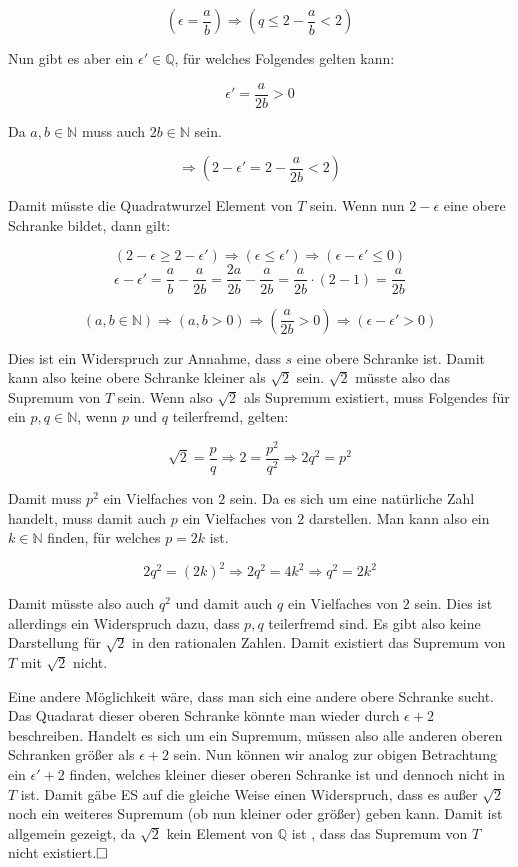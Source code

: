 \documentclass[11pt, a4paper]{article}
\begin{document}
		\[ \left(\epsilon = \dfrac{a}{b}\right) \Rightarrow (q \leq 2-\dfrac{a}{b} < 2) \]

		Nun gibt es aber ein $\epsilon' \in \mathbb{Q}$, für welches Folgendes gelten kann:

		\[ \epsilon' = \dfrac{a}{2b} > 0 \]

		Da $a,b \in \mathbb{N}$ muss auch $2b \in \mathbb{N}$ sein.

		\[ \Rightarrow \left( 2- \epsilon' = 2 - \dfrac{a}{2b} < 2 \right) \]

		Damit müsste die Quadratwurzel Element von $T$ sein. Wenn nun $2-\epsilon$ eine obere Schranke bildet, dann gilt:

		\[ (2-\epsilon \geq 2 -\epsilon') \Rightarrow (\epsilon \leq \epsilon') \Rightarrow (\epsilon - \epsilon' \leq 0) \]
		\[ \epsilon - \epsilon' = \dfrac{a}{b} - \dfrac{a}{2b} = \dfrac{2a}{2b} - \dfrac{a}{2b} = \dfrac{a}{2b}\cdot (2-1) = \dfrac{a}{2b} \]

		\[ (a,b \in \mathbb{N}) \Rightarrow (a,b > 0) \Rightarrow \left( \dfrac{a}{2b} > 0 \right) \Rightarrow (\epsilon - \epsilon' > 0) \]

		Dies ist ein Widerspruch zur Annahme, dass $s$ eine obere Schranke ist. Damit kann also keine obere Schranke kleiner als $\sqrt{2}$ sein. $\sqrt{2}$ müsste also das Supremum von $T$ sein. Wenn also $\sqrt{2}$ als Supremum existiert, muss Folgendes für ein $p,q \in \mathbb{N}$, wenn $p$ und $q$ teilerfremd, gelten:

		\[ \sqrt{2} = \dfrac{p}{q} \Rightarrow 2 = \dfrac{p^2}{q^2} \Rightarrow 2q^2 = p^2 \] 

		Damit muss $p^2$ ein Vielfaches von $2$ sein. Da es sich um eine natürliche Zahl handelt, muss damit auch $p$ ein Vielfaches von $2$ darstellen. Man kann also ein $k \in \mathbb{N}$ finden, für welches $p = 2k$ ist.

		\[ 2q^2 = (2k)^2 \Rightarrow 2q^2 = 4k^2 \Rightarrow q^2 = 2k^2 \]

		Damit müsste also auch $q^2$ und damit auch $q$ ein Vielfaches von $2$ sein. Dies ist allerdings ein Widerspruch dazu, dass $p,q$ teilerfremd sind. Es gibt also keine Darstellung für $\sqrt{2}$ in den rationalen Zahlen. Damit existiert das Supremum von $T$ mit $\sqrt{2}$ nicht.

		Eine andere Möglichkeit wäre, dass man sich eine andere obere Schranke sucht. Das Quadarat dieser oberen Schranke könnte man wieder durch $\epsilon + 2$ beschreiben. Handelt es sich um ein Supremum, müssen also alle anderen oberen Schranken größer als $\epsilon + 2$ sein. Nun können wir analog zur obigen Betrachtung ein $\epsilon' + 2$ finden, welches kleiner dieser oberen Schranke ist und dennoch nicht in $T$ ist. Damit gäbe ES auf die gleiche Weise einen Widerspruch, dass es außer $\sqrt{2}$ noch ein weiteres Supremum (ob nun kleiner oder größer) geben kann. Damit ist allgemein gezeigt, da $\sqrt{2}$ kein Element von $\mathbb{Q}$ ist , dass das Supremum von $T$ nicht existiert.$\hfill\Box$
\end{document}
